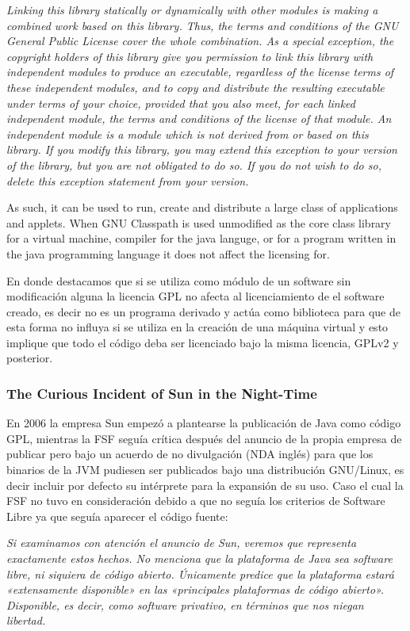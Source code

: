 \documentclass[11pt]{scrartcl}
\begin{document}
    \emph{Linking this library statically or dynamically with other modules is making a combined work based on this library. Thus, the terms and conditions of the GNU General Public License cover the whole combination.
As a special exception, the copyright holders of this library give you permission to link this library with independent modules to produce an executable, regardless of the license terms of these independent modules, and to copy and distribute the resulting executable under terms of your choice, provided that you also meet, for each linked independent module, the terms and conditions of the license of that module. An independent module is a module which is not derived from or based on this library. If you modify this library, you may extend this exception to your version of the library, but you are not obligated to do so. If you do not wish to do so, delete this exception statement from your version.}

As such, it can be used to run, create and distribute a large class of applications and applets. When GNU Classpath is used unmodified as the core class library for a virtual machine, compiler for the java languge, or for a program written in the java programming language it does not affect the licensing for.

En donde destacamos que si se utiliza como módulo de un software sin modificación alguna la licencia GPL no afecta al licenciamiento de el software creado, es decir no es un programa derivado y actúa como biblioteca para que de esta forma no influya si se utiliza en la creación de una máquina virtual y esto implique que todo el código deba ser licenciado bajo la misma licencia, GPLv2 y posterior.

\subsubsection{The Curious Incident of Sun in the Night-Time}

En 2006 la empresa Sun empezó a plantearse la publicación de Java como código GPL, mientras la FSF seguía crítica después del anuncio de la propia empresa de publicar pero bajo un acuerdo de no divulgación (NDA inglés) para que los binarios de la JVM pudiesen ser publicados bajo una distribución GNU/Linux, es decir incluir por defecto su intérprete para la expansión de su uso. Caso el cual la FSF no tuvo en consideración debido a que no seguía los criterios de Software Libre ya que seguía aparecer el código fuente:

    \emph{Si examinamos con atención el anuncio de Sun, veremos que representa exactamente estos hechos. No menciona que la plataforma de Java sea software libre, ni siquiera de código abierto. Únicamente predice que la plataforma estará «extensamente disponible» en las «principales plataformas de código abierto». Disponible, es decir, como software privativo, en términos que nos niegan libertad.}
\end{document}
